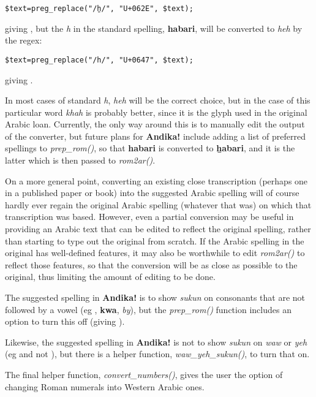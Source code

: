 \verb|$text=preg_replace("/ẖ/", "U+062E", $text);|

giving , but the \textit{h} in the standard spelling, \textbf{habari}, will be converted to \textit{heh} by the regex:

\verb|$text=preg_replace("/h/", "U+0647", $text);|

giving .

In most cases of standard \textit{h}, \textit{heh} will be the correct choice, but in the case of this particular word \textit{khah} is probably better, since it is the glyph used in the original Arabic loan.  Currently, the only way around this is to manually edit the output of the converter, but future plans for \textbf{Andika!} include adding a list of preferred spellings to \textit{prep\_rom()}, so that \textbf{habari} is converted to \textbf{ẖabari}, and it is the latter which is then passed to \textit{rom2ar()}.

On a more general point, converting an existing close transcription (perhaps one in a published paper or book) into the suggested Arabic spelling will of course hardly ever regain the original Arabic spelling (whatever that was) on which that transcription was based.  However, even a partial conversion may be useful in providing an Arabic text that can be edited to reflect the original spelling, rather than starting to type out the original from scratch.  If the Arabic spelling in the original has well-defined features, it may also be worthwhile to edit \textit{rom2ar()} to reflect those features, so that the conversion will be as close as possible to the original, thus limiting the amount of editing to be done.

The suggested spelling in \textbf{Andika!} is to show \textit{sukun} on consonants that are not followed by a vowel (eg , \textbf{kwa}, \textit{by}), but the \textit{prep\_rom()} function includes an option to turn this off (giving ).

Likewise, the suggested spelling in \textbf{Andika!} is not to show \textit{sukun} on \textit{waw} or \textit{yeh} (eg  and not ), but there is a helper function, \textit{waw\_yeh\_sukun()}, to turn that on.

The final helper function, \textit{convert\_numbers()}, gives the user the option of changing Roman numerals into Western Arabic ones.
